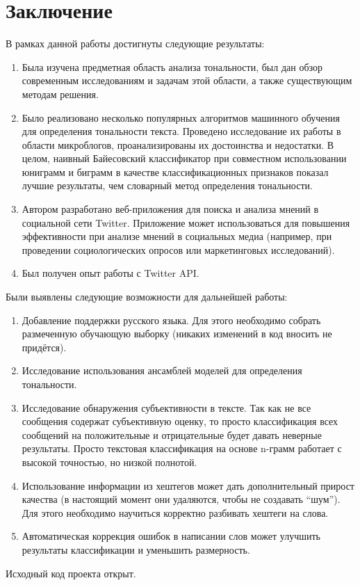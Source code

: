 \section*{Заключение}

В рамках данной работы достигнуты следующие результаты:

\begin{enumerate}

\item
Была изучена предметная область анализа тональности,
был дан обзор современным исследованиям и задачам этой области,
а также существующим методам решения.

\item
Было реализовано несколько популярных алгоритмов машинного обучения 
для определения тональности текста. 
Проведено исследование их работы в области
микроблогов, проанализированы их достоинства и недостатки.
В целом, наивный Байесовский классификатор при
совместном использовании юниграмм
и биграмм в качестве классификационных признаков
показал лучшие результаты, чем словарный метод определения тональности.

\item
Автором разработано веб-приложения для поиска и анализа мнений
в социальной сети Twitter. Приложение может использоваться для
повышения эффективности при анализе мнений в социальных медиа 
(например, при проведении социологических опросов или маркетинговых исследований).

\item
Был получен опыт работы с Twitter API.

\end{enumerate}

Были выявлены следующие возможности для дальнейшей работы:
\begin{enumerate}

\item
Добавление поддержки русского языка. Для этого необходимо собрать размеченную обучающую выборку (никаких изменений в код вносить не придётся).

\item
Исследование использования ансамблей моделей для определения тональности.

\item
Исследование обнаружения субъективности в тексте. Так как не все сообщения
содержат субъективную оценку, то просто классификация всех сообщений
на положительные и отрицательные будет давать неверные результаты.
Просто текстовая классификация на основе n-грамм работает с высокой точностью,
но низкой полнотой.

\item
Использование информации из хештегов может дать дополнительный прирост 
качества (в настоящий момент они удаляются, чтобы не создавать ``шум''). 
Для этого необходимо научиться корректно разбивать хештеги на слова.

\item
Автоматическая коррекция ошибок в написании слов может улучшить результаты классификации и уменьшить размерность.

\end{enumerate}

Исходный код проекта открыт.